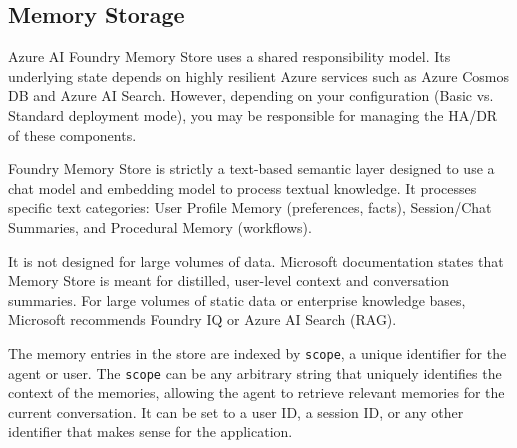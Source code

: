 \documentclass[9pt]{extarticle}%
\begin{document}
\subsection{Memory Storage}%
Azure AI Foundry Memory Store uses a shared responsibility model. Its underlying state depends on highly resilient Azure services such as Azure Cosmos DB and Azure AI Search. However, depending on your configuration (Basic vs. Standard deployment mode), you may be responsible for managing the HA/DR of these components.
%
\par\vspace{\baselineskip}%
Foundry Memory Store is strictly a text-based semantic layer designed to use a chat model and embedding model to process textual knowledge. It processes specific text categories: User Profile Memory (preferences, facts), Session/Chat Summaries, and Procedural Memory (workflows).
%
\par\vspace{\baselineskip}%
It is not designed for large volumes of data. Microsoft documentation states that Memory Store is meant for distilled, user-level context and conversation summaries. For large volumes of static data or enterprise knowledge bases, Microsoft recommends Foundry IQ or Azure AI Search (RAG).
%
\par\vspace{\baselineskip}%
The memory entries in the store are indexed by \texttt{scope}, a unique identifier for the agent or user. The \texttt{scope} can be any arbitrary string that uniquely identifies the context of the memories, allowing the agent to retrieve relevant memories for the current conversation. It can be set to a user ID, a session ID, or any other identifier that makes sense for the application.
%
\par\vspace{\baselineskip}%
\end{document}
